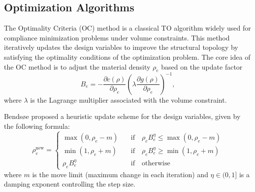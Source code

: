 \documentclass[mathpazo]{cicp}
\begin{document}
\subsection{Optimization Algorithms}
The Optimality Criteria (OC) method is a classical TO algorithm widely used for compliance minimization problems under volume constraints. This method iteratively updates the design variables to improve the structural topology by satisfying the optimality conditions of the optimization problem. The core idea of the OC method is to adjust the material density $\rho_e$ based on the update factor
\begin{equation*}
	B_e = -\frac{\partial{c}(\rho)}{\partial\rho_e}\left(\lambda\frac{\partial{g}(\rho)}{\partial\rho_e}\right)^{-1},
\end{equation*}
where $\lambda$ is the Lagrange multiplier associated with the volume constraint.
 
Bendsøe \cite{bendsoe1995optimization} proposed a heuristic update scheme for the design variables, given by the following formula:
\begin{equation*}
	\rho_e^{\text{new}}=
	\begin{cases}
		\max(0,\rho_e-m)\quad&\text{if}\quad \rho_eB_e^\eta\leq\max(0,\rho_e-m)\\
		\min(1,\rho_e+m)\quad&\text{if}\quad\rho_eB_e^\eta \geq \min(1,\rho_e+m)\\
		\rho_eB_e^\eta\quad&\text{if}\quad\text{otherwise}
	\end{cases}
\end{equation*}
where $m$ is the move limit (maximum change in each iteration) and $\eta\in(0,1]$ is a damping exponent controlling the step size. 
\end{document}

